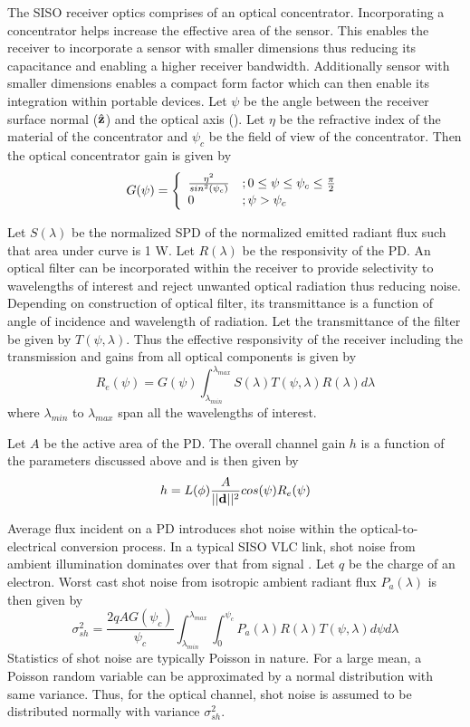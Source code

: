 The SISO receiver optics comprises of an optical concentrator. Incorporating a concentrator helps increase the effective area of the sensor. This enables the receiver to incorporate a sensor with smaller dimensions thus reducing its capacitance and enabling a higher receiver bandwidth. Additionally sensor with smaller dimensions enables a compact form factor which can then enable its integration within portable devices. Let $\psi$ be the angle between the receiver surface normal ($\hat{\bf{z}}$) and the optical axis (). Let $\eta$ be the refractive index of the material of the concentrator and $\psi_{c}$ be the field of view of the concentrator. Then the optical concentrator gain is given by
\begin{equation}
	\label{eqOpGain}
	G(\psi) = \left\{ \begin{array}{ll} \frac{\eta^{2}}{sin^{2}(\psi_{c})} &; 0\leq\psi\leq\psi_{c}\leq\frac{\pi}{2} \\ 0 &; \psi>\psi_{c} \end{array} \right.
\end{equation}

Let $S(\lambda)$ be the normalized SPD of the normalized emitted radiant flux such that area under curve is 1 W. Let $R(\lambda)$ be the responsivity of the PD. An optical filter can be incorporated within the receiver to provide selectivity to wavelengths of interest and reject unwanted optical radiation thus reducing noise. Depending on construction of optical filter, its transmittance is a function of angle of incidence and wavelength of radiation. Let the transmittance of the filter be given by $T(\psi,\lambda)$. Thus the effective responsivity of the receiver including the transmission and gains from all optical components is given by 
\begin{equation}
	\label{eqReff}
	R_{e}(\psi) = G(\psi)\int^{\lambda_{max}}_{\lambda_{min}}S(\lambda)T(\psi,\lambda)R(\lambda)d\lambda
\end{equation}
where $\lambda_{min}$ to $\lambda_{max}$ span all the wavelengths of interest.

Let $A$ be the active area of the PD. The overall channel gain $h$ is a function of the parameters discussed above and is then given by
\begin{equation}
	\label{eqChGain}
	h = L(\phi)\frac{A}{||{\bf{d}}||^{2}}cos(\psi)R_{e}(\psi)
\end{equation}

Average flux incident on a PD introduces shot noise within the optical-to-electrical conversion process. In a typical SISO VLC link, shot noise from ambient illumination dominates over that from signal \cite{bar94a}. Let $q$ be the charge of an electron. Worst cast shot noise from isotropic ambient radiant flux $P_{a}(\lambda)$ is then given by
\begin{equation}
	\label{eqNshot}
	\sigma_{sh}^{2} = \frac{2qAG(\psi_{c})}{\psi_{c}}\int_{\lambda_{min}}^{\lambda_{max}}\int_{0}^{\psi_{c}}P_{a}(\lambda)R(\lambda)T(\psi,\lambda)d\psi d\lambda
\end{equation}
Statistics of shot noise are typically Poisson in nature. For a large mean, a Poisson random variable can be approximated by a normal distribution with same variance. Thus, for the optical channel, shot noise is assumed to be distributed normally with variance $\sigma_{sh}^{2}$.

